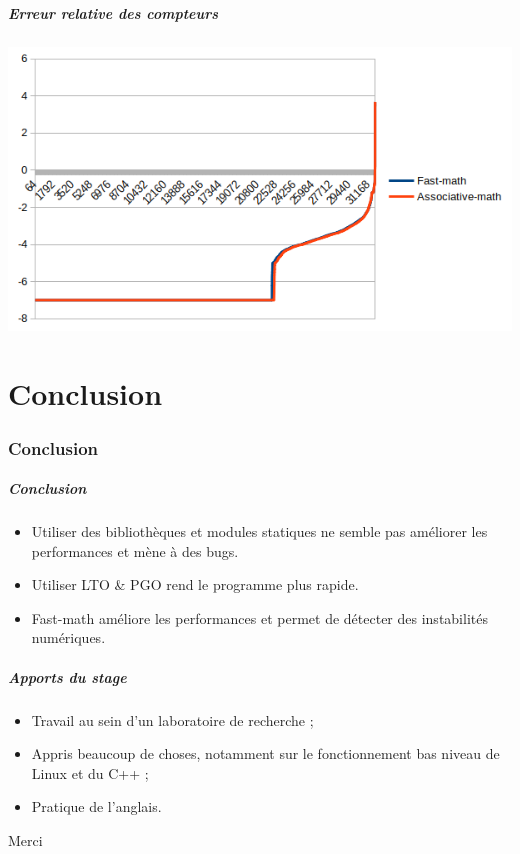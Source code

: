 \documentclass{beamer}
\begin{document}
\begin{frame}[fragile]
    \frametitle{Erreur relative des compteurs}

    \includegraphics[width=\textwidth, center]{fast-math_difference.png}
\end{frame}

\part{Conclusion}
\section*{Conclusion}

\begin{frame}[fragile]
    \frametitle{Conclusion}

    \begin{itemize}
        \item Utiliser des bibliothèques et modules statiques ne semble pas améliorer les performances et mène à des bugs.
        \item Utiliser LTO \& PGO rend le programme plus rapide.
        \item Fast-math améliore les performances et permet de détecter des instabilités numériques.
    \end{itemize}
\end{frame}

\begin{frame}[fragile]
    \frametitle{Apports du stage}

    \begin{itemize}
        \item Travail au sein d'un laboratoire de recherche ;
        \item Appris beaucoup de choses, notamment sur le fonctionnement bas niveau de Linux et du C++ ;
        \item Pratique de l'anglais.
    \end{itemize}
\end{frame}

\begin{frame}[fragile]
    \begin{Huge}
        \centerline{Merci}
    \end{Huge}
\end{frame}


\appendix
\end{document}
